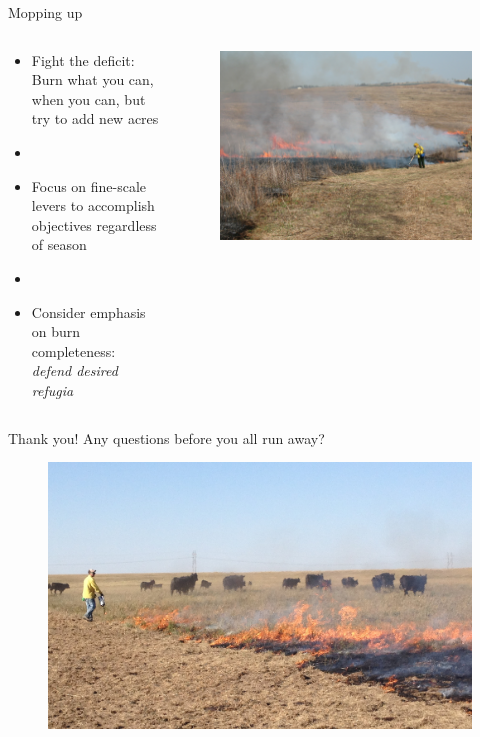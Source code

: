 \documentclass[11pt]{beamer}
\begin{document}
\begin{frame}{Mopping up} 

\begin{columns}
\begin{column}{0.55\textwidth}
\begin{itemize}
	\item Fight the deficit: Burn what you can, when you can, but try to add new acres
	\item[]
		\item Focus on fine-scale levers to accomplish objectives regardless of season
	\item[]
	\item Consider emphasis on burn completeness: \emph{defend desired refugia}

\end{itemize}
\end{column}
\begin{column}{0.5\textwidth}  
\begin{center}
\begin{figure}
\includegraphics[width=1\linewidth]{figs/mop_up} 
 \end{figure}
\end{center}
\end{column}
\end{columns}
\end{frame}

\begin{frame}{Thank you!}
Any questions before you all run away?
\begin{center}
\begin{figure}
 \includegraphics[width=1\linewidth]{figs/fire_cows_close} 

 \end{figure}
\end{center}
\end{frame}
\end{document}
